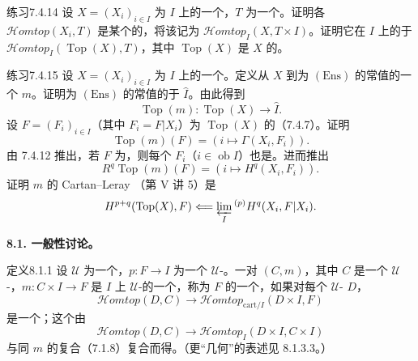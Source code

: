 \begin{SGAresult}{练习}{7.4.14}
设 $X=(X_i)_{i\in I}$ 为 $I$ 上的一个，$T$ 为一个。证明各 $\mathscr{H}\!omtop(X_i,T)$ 是某个的，将该记为 $\mathscr{H}\!omtop_I(X,T\times I)$。证明它在 $I$ 上的于 $\mathscr{H}\!omtop_I(\operatorname{Top}(X),T)$，其中 $\operatorname{Top}(X)$ 是 $X$ 的。
\end{SGAresult}
\begin{SGAresult}{练习}{7.4.15}
设 $X=(X_i)_{i\in I}$ 为 $I$ 上的一个。定义从 $X$ 到为 $(\mathrm{Ens})$ 的常值的一个 $m$。证明为 $(\mathrm{Ens})$ 的常值的于 $\widehat I$。由此得到
\[\operatorname{Top}(m):\operatorname{Top}(X)\longrightarrow\widehat I.\]
设 $F=(F_i)_{i\in I}$（其中 $F_i=F|X_i$）为 $\operatorname{Top}(X)$ 的（7.4.7）。证明
\[\operatorname{Top}(m)(F)=(i\mapsto\Gamma(X_i,F_i)).\]
由 7.4.12 推出，若 $F$ 为，则每个 $F_i$（$i\in\operatorname{ob}I$）也是。进而推出
\[R^q\operatorname{Top}(m)(F)=(i\mapsto H^q(X_i,F_i)).\]
证明 $m$ 的 Cartan--Leray （第 V 讲 5）是
\[H^{p+q}(\operatorname{Top}(X),F)\Longleftarrow\varprojlim_I{}^{(p)}H^q(X_i,F|X_i).\]
\end{SGAresult}
\textbf{8.1. 一般性讨论。}
\begin{SGAresult}{定义}{8.1.1}
设 $\mathcal U$ 为一个，$p:F\to I$ 为一个 $\mathcal U$-。一对 $(C,m)$，其中 $C$ 是一个 $\mathcal U$-，$m:C\times I\to F$ 是 $I$ 上 $\mathcal U$-的一个，称为 $F$ 的一个，如果对每个 $\mathcal U$- $D$，
\[\mathscr{H}\!omtop(D,C)\longrightarrow\mathscr{H}\!omtop_{\mathrm{cart}/I}(D\times I,F)\tag{8.1.1.1}\]
是一个；这个由
\[\mathscr{H}\!omtop(D,C)\longrightarrow\mathscr{H}\!omtop_I(D\times I,C\times I)\]
与同 $m$ 的复合（7.1.8）复合而得。（更“几何”的表述见 8.1.3.3。）
\end{SGAresult}
